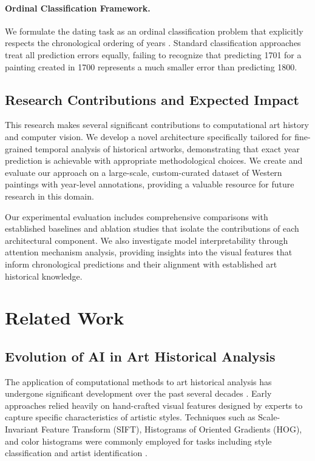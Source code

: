 \documentclass[10pt,twocolumn,letterpaper]{article}
\begin{document}
\paragraph{Ordinal Classification Framework.} We formulate the dating task as an ordinal classification problem that explicitly respects the chronological ordering of years \cite{Cheng08Ordinal, Cao20Ordinal}. Standard classification approaches treat all prediction errors equally, failing to recognize that predicting 1701 for a painting created in 1700 represents a much smaller error than predicting 1800.

\subsection{Research Contributions and Expected Impact}

This research makes several significant contributions to computational art history and computer vision. We develop a novel architecture specifically tailored for fine-grained temporal analysis of historical artworks, demonstrating that exact year prediction is achievable with appropriate methodological choices. We create and evaluate our approach on a large-scale, custom-curated dataset of Western paintings with year-level annotations, providing a valuable resource for future research in this domain.

Our experimental evaluation includes comprehensive comparisons with established baselines and ablation studies that isolate the contributions of each architectural component. We also investigate model interpretability through attention mechanism analysis, providing insights into the visual features that inform chronological predictions and their alignment with established art historical knowledge.

\section{Related Work}

\subsection{Evolution of AI in Art Historical Analysis}

The application of computational methods to art historical analysis has undergone significant development over the past several decades \cite{Cetinic21}. Early approaches relied heavily on hand-crafted visual features designed by experts to capture specific characteristics of artistic styles. Techniques such as Scale-Invariant Feature Transform (SIFT), Histograms of Oriented Gradients (HOG), and color histograms were commonly employed for tasks including style classification and artist identification \cite{Karayev14}.
\end{document}
